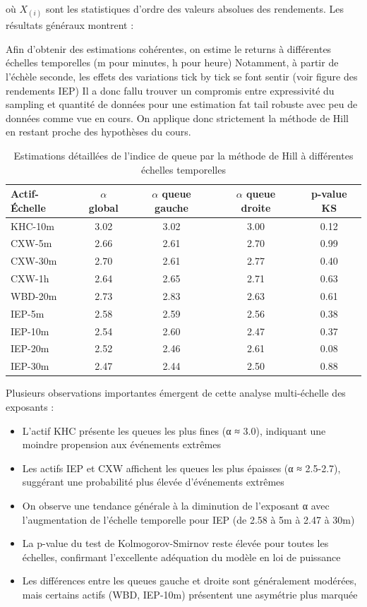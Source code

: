 \documentclass[10pt,a4paper]{article}
\theoremstyle{definition}
\theoremstyle{remark}
\begin{document}
\begin{itemize}
où $X_{(i)}$ sont les statistiques d'ordre des valeurs absolues des rendements. Les résultats généraux montrent :

Afin d'obtenir des estimations cohérentes, on estime le returns à différentes échelles temporelles (m pour minutes, h pour heure)
Notamment, à partir de l'échèle seconde, les effets des variations tick by tick se font sentir (voir figure des rendements IEP)
Il a donc fallu trouver un compromis entre expressivité du sampling et quantité de données pour une estimation fat tail robuste avec peu de données comme vue en cours.
On applique donc strictement la méthode de Hill en restant proche des hypothèses du cours.



\begin{table}[H]
\centering
\begin{tabular}{lcccc}
\toprule
Actif-Échelle & $\alpha$ global & $\alpha$ queue gauche & $\alpha$ queue droite & p-value KS \\
\midrule
KHC-10m & 3.02 & 3.02 & 3.00 & 0.12 \\
\midrule
CXW-5m & 2.66 & 2.61 & 2.70 & 0.99 \\
CXW-30m & 2.70 & 2.61 & 2.77 & 0.40 \\
CXW-1h & 2.64 & 2.65 & 2.71 & 0.63 \\
\midrule
WBD-20m & 2.73 & 2.83 & 2.63 & 0.61 \\
\midrule
IEP-5m & 2.58 & 2.59 & 2.56 & 0.38 \\
IEP-10m & 2.54 & 2.60 & 2.47 & 0.37 \\
IEP-20m & 2.52 & 2.46 & 2.61 & 0.08 \\
IEP-30m & 2.47 & 2.44 & 2.50 & 0.88 \\
\bottomrule
\end{tabular}
\caption{Estimations détaillées de l'indice de queue par la méthode de Hill à différentes échelles temporelles}
\label{tab:hill_detail_moved}
\end{table}

Plusieurs observations importantes émergent de cette analyse multi-échelle des exposants :

\begin{itemize}
    \item L'actif KHC présente les queues les plus fines (α ≈ 3.0), indiquant une moindre propension aux événements extrêmes
    \item Les actifs IEP et CXW affichent les queues les plus épaisses (α ≈ 2.5-2.7), suggérant une probabilité plus élevée d'événements extrêmes
    \item On observe une tendance générale à la diminution de l'exposant α avec l'augmentation de l'échelle temporelle pour IEP (de 2.58 à 5m à 2.47 à 30m)
    \item La p-value du test de Kolmogorov-Smirnov reste élevée pour toutes les échelles, confirmant l'excellente adéquation du modèle en loi de puissance
    \item Les différences entre les queues gauche et droite sont généralement modérées, mais certains actifs (WBD, IEP-10m) présentent une asymétrie plus marquée
\end{itemize}


\end{itemize}
\end{document}
